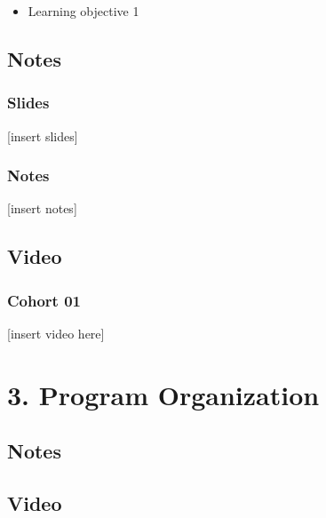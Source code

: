\documentclass[
  letterpaper,
  DIV=11,
  numbers=noendperiod]{scrreprt}
\providecommand{\tightlist}{%
  \setlength{\itemsep}{0pt}\setlength{\parskip}{0pt}}
\begin{document}
\begin{itemize}
\tightlist
\item
  Learning objective 1
\end{itemize}

\hypertarget{notes-2}{%
\chapter*{Notes}\label{notes-2}}

\hypertarget{slides-1}{%
\section*{Slides}\label{slides-1}}

{[}insert slides{]}

\hypertarget{notes-3}{%
\section*{Notes}\label{notes-3}}

{[}insert notes{]}

\hypertarget{video-1}{%
\chapter*{Video}\label{video-1}}

\hypertarget{cohort-01-1}{%
\section*{Cohort 01}\label{cohort-01-1}}

{[}insert video here{]}

\part{3. Program Organization}

\hypertarget{notes-4}{%
\chapter{Notes}\label{notes-4}}

\hypertarget{video-2}{%
\chapter{Video}\label{video-2}}
\end{document}
